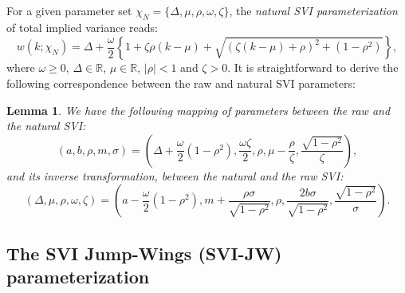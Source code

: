\documentclass[12pt]{article}
\newtheorem{lemma}{Lemma}[section]
\numberwithin{equation}{section}
\begin{document}
For a given parameter set $\chi_N=\{\Delta, \mu,\rho,\omega,\zeta \}$, the {\em natural SVI parameterization} of total implied variance reads:
\begin{equation}\label{eq:SVInatural}
w(k;\chi _N) =
\Delta+\frac{\omega}{2}\left\{1+\zeta\rho \left(k - \mu\right) +
\sqrt{\left(\zeta(k-\mu)+\rho \right)^2+\left(1-\rho^2\right)}\right\},
\end{equation}
where $\omega\geq 0$, $\Delta\in\mathbb{R}$, $\mu\in\mathbb{R}$, $|\rho|<1$ and $\zeta>0$.
It is straightforward to derive the following correspondence between the raw
and natural SVI parameters:
\begin{lemma}
We have the following mapping of parameters between the raw and the natural SVI:
\begin{equation}\label{eq:NaturalToRaw}
\left(a, b, \rho, m, \sigma\right)
 =
\left(\Delta+\frac{\omega}{2}\left(1-\rho^2\right), \frac{\omega\zeta}{2}, \rho, \mu-\frac{\rho}{\zeta}, \frac{\sqrt{1-\rho^2}}{\zeta}\right),
\end{equation}
and its inverse transformation, between the natural and the raw SVI:
\begin{equation}\label{eq:RawToNatural}
\left(\Delta, \mu,\rho,\omega,\zeta \right)
=
\left(
a-\frac{\omega}{2}\left(1-\rho^2\right),
m+\frac{\rho\sigma}{\sqrt{1-\rho^2}},
\rho,
\frac{2b\sigma}{\sqrt{1-\rho^2}},
\frac{\sqrt{1-\rho^2}}{\sigma}\right).
\end{equation}
\end{lemma}


\subsection{The SVI Jump-Wings (SVI-JW) parameterization}
\end{document}
